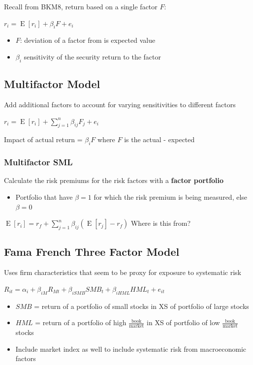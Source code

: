 \documentclass[]{book}
\providecommand{\tightlist}{%
  \setlength{\itemsep}{0pt}\setlength{\parskip}{0pt}}
\theoremstyle{definition}
\theoremstyle{definition}
\theoremstyle{remark}
\begin{document}
Recall from BKM8, return based on a single factor \(F\):

\(r_i = \operatorname{E}[r_i] + \beta_i F + e_i\)

\begin{itemize}
\item
  \(F\): deviation of a factor from is expected value
\item
  \(\beta_i\) sensitivity of the security return to the factor
\end{itemize}

\subsection{Multifactor Model}\label{multifactor-model}

Add additional factors to account for varying sensitivities to different
factors

\(r_i = \operatorname{E}[r_i] + \sum \limits_{j=1}^n \beta_{ij} F_j + e_i\)

Impact of actual return = \(\beta_i F\) where \(F\) is the actual -
expected

\subsubsection{Multifactor SML}\label{multifactor-sml}

Calculate the risk premiums for the risk factors with a \textbf{factor
portfolio}

\begin{itemize}
\tightlist
\item
  Portfolio that have \(\beta = 1\) for which the risk premium is being
  measured, else \(\beta = 0\)
\end{itemize}

\(\operatorname{E}[r_i] = r_f + \sum \limits_{j=1}^n \beta_{ij} \left( \operatorname{E}[r_j] -r_f \right)\)
{Where is this from?}

\subsection{Fama French Three Factor
Model}\label{fama-french-three-factor-model}

Uses firm characteristics that seem to be proxy for exposure to
systematic risk

\(R_{it} = \alpha_i + \beta_{iM}R_{Mt} + \beta_{iSMB}SMB_t + \beta_{iHML}HML_t + e_{it}\)

\begin{itemize}
\item
  \(SMB\) = return of a portfolio of small stocks in XS of portfolio of
  large stocks
\item
  \(HML\) = return of a portfolio of high
  \(\frac{\text{book}}{\text{market}}\) in XS of portfolio of low
  \(\frac{\text{book}}{\text{market}}\) stocks
\item
  Include market index as well to include systematic risk from
  macroeconomic factors
\end{itemize}
\end{document}
